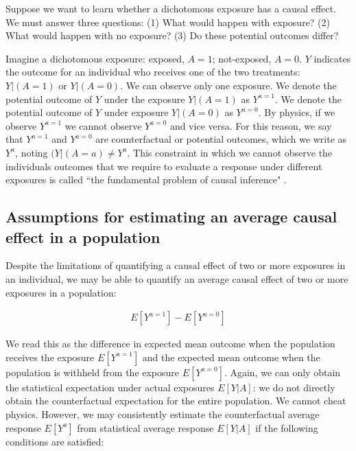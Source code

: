 \documentclass[]{interact}
\theoremstyle{plain}%
\theoremstyle{definition}
\theoremstyle{remark}
\begin{document}
Suppose we want to learn whether a dichotomous exposure has a causal effect. We must answer three questions: (1) What would happen with exposure? (2) What would happen with no exposure? (3) Do these potential outcomes differ? 

Imagine a dichotomous exposure: exposed, $A = 1$; not-exposed, $A = 0$. $Y$ indicates the outcome for an individual who receives one of the two treatments: $Y|(A=1)$ or $Y|(A=0)$. We can observe only one exposure. We denote the potential outcome of $Y$ under the exposure $Y|(A=1)$ as $Y^{a=1}$. We denote the potential outcome of $Y$ under exposure $Y|(A=0)$ as $Y^{a=0}$. By physics, if we observe $Y^{a=1}$ we cannot observe $Y^{a=0}$ and vice versa. For this reason, we say that $Y^{a=1}$ and $Y^{a=0}$ are counterfactual or potential outcomes, which we write as $Y^{a}$, noting $(Y|(A=a) \neq Y^{a}$. This constraint in which we cannot observe the individuals outcomes that we require to evaluate a response under different exposures is called ``the fundamental problem of causal inference" \cite{rubin_inference_1976,holland_statistics_1986, gelman_bayesian_2020}.

\subsection{Assumptions for estimating an average causal effect in a population}


Despite the limitations of quantifying a causal effect of two or more exposures in an individual, we may be able to quantify an average causal effect of two or more exposures in a population: 

$$
\begin{aligned}
 E[Y^{a=1}]-E[Y^{a=0}]  
\end{aligned}
$$

We read this as the difference in expected mean outcome when the population receives the exposure $E[Y^{a=1}]$ and the expected mean outcome when the population is withheld from the exposure $E[Y^{a=0}]$. Again, we can only obtain the statistical expectation under actual exposures $E[Y|A]$: we do not directly obtain the counterfactual expectation for the entire population. We cannot cheat physics. However, we may consistently estimate the counterfactual average response $E[Y^a]$ from statistical average response $E[Y|A]$ if the following conditions are satisfied:
\end{document}
